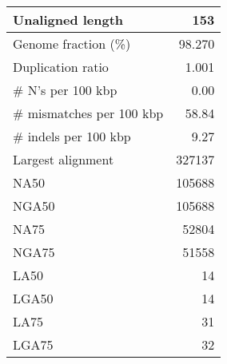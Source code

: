 \documentclass[12pt,a4paper]{article}
\begin{document}
\begin{table}[ht]
\begin{center}
\begin{tabular}{|l*{1}{|r}|}
Unaligned length & 153 \\ \hline
Genome fraction (\%) & 98.270 \\ \hline
Duplication ratio & 1.001 \\ \hline
\# N's per 100 kbp & 0.00 \\ \hline
\# mismatches per 100 kbp & 58.84 \\ \hline
\# indels per 100 kbp & 9.27 \\ \hline
Largest alignment & 327137 \\ \hline
NA50 & 105688 \\ \hline
NGA50 & 105688 \\ \hline
NA75 & 52804 \\ \hline
NGA75 & 51558 \\ \hline
LA50 & 14 \\ \hline
LGA50 & 14 \\ \hline
LA75 & 31 \\ \hline
LGA75 & 32 \\ \hline
\end{tabular}
\end{center}
\end{table}
\end{document}
